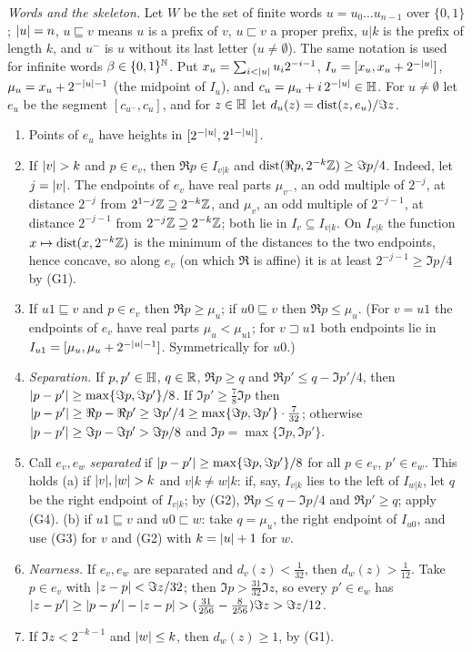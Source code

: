 \emph{Words and the skeleton.} Let $W$ be the set of finite words $u=u_0\dots u_{n-1}$ over $\{0,1\}$; $\lvert u\rvert=n$, $u\sqsubseteq v$
means $u$ is a prefix of $v$, $u\sqsubset v$ a proper prefix, $u|k$ is the prefix of length $k$, and $u^-$ is $u$ without its last
letter ($u\ne\emptyset$). The same notation is used for infinite words $\beta\in\{0,1\}^{\mathbb{N}}$. Put $x_u=\sum_{i<\lvert u\rvert}u_i2^{-i-1}$,
$I_u=[x_u,x_u+2^{-\lvert u\rvert}]$, $\mu_u=x_u+2^{-\lvert u\rvert-1}$ (the midpoint of $I_u$), and $c_u=\mu_u+i\,2^{-\lvert u\rvert}\in\mathbb{H}$. For
$u\ne\emptyset$ let $e_u$ be the segment $[c_{u^-},c_u]$, and for $z\in\mathbb{H}$ let $d_u(z)=\operatorname{dist}(z,e_u)/\Im z$.

\begin{enumerate}
\item[(G1)] Points of $e_u$ have heights in $[2^{-\lvert u\rvert},2^{1-\lvert u\rvert}]$.
\item[(G2)] If $\lvert v\rvert>k$ and $p\in e_v$, then $\Re p\in I_{v|k}$ and $\operatorname{dist}(\Re p,2^{-k}\mathbb{Z})\ge\Im p/4$. Indeed, let $j=\lvert v\rvert$.
The endpoints of $e_v$ have real parts $\mu_{v^-}$, an odd multiple of $2^{-j}$, at distance $2^{-j}$ from $2^{1-j}\mathbb{Z}\supseteq2^{-k}\mathbb{Z}$,
and $\mu_v$, an odd multiple of $2^{-j-1}$, at distance $2^{-j-1}$ from $2^{-j}\mathbb{Z}\supseteq2^{-k}\mathbb{Z}$; both lie in $I_v\subseteq I_{v|k}$.
On $I_{v|k}$ the function $x\mapsto\operatorname{dist}(x,2^{-k}\mathbb{Z})$ is the minimum of the distances to the two endpoints, hence concave, so along
$e_v$ (on which $\Re$ is affine) it is at least $2^{-j-1}\ge\Im p/4$ by (G1).
\item[(G3)] If $u1\sqsubseteq v$ and $p\in e_v$ then $\Re p\ge\mu_u$; if $u0\sqsubseteq v$ then $\Re p\le\mu_u$. (For $v=u1$ the
endpoints of $e_v$ have real parts $\mu_u<\mu_{u1}$; for $v\sqsupset u1$ both endpoints lie in $I_{u1}=[\mu_u,\mu_u+2^{-\lvert u\rvert-1}]$.
Symmetrically for $u0$.)
\item[(G4)] \emph{Separation.} If $p,p'\in\mathbb{H}$, $q\in\mathbb{R}$, $\Re p\ge q$ and $\Re p'\le q-\Im p'/4$, then
$\lvert p-p'\rvert\ge\max\{\Im p,\Im p'\}/8$. If $\Im p'\ge\frac78\Im p$ then $\lvert p-p'\rvert\ge\Re p-\Re p'\ge\Im p'/4\ge\max\{\Im p,\Im p'\}\cdot\frac7{32}$;
otherwise $\lvert p-p'\rvert\ge\Im p-\Im p'>\Im p/8$ and $\Im p=\max\{\Im p,\Im p'\}$.
\item[(G5)] Call $e_v,e_w$ \emph{separated} if $\lvert p-p'\rvert\ge\max\{\Im p,\Im p'\}/8$ for all $p\in e_v$, $p'\in e_w$. This holds
(a) if $\lvert v\rvert,\lvert w\rvert>k$ and $v|k\ne w|k$: if, say, $I_{v|k}$ lies to the left of $I_{w|k}$, let $q$ be the right endpoint of $I_{v|k}$; by
(G2), $\Re p\le q-\Im p/4$ and $\Re p'\ge q$; apply (G4). (b) if $u1\sqsubseteq v$ and $u0\sqsubset w$: take $q=\mu_u$, the right endpoint
of $I_{u0}$, and use (G3) for $v$ and (G2) with $k=\lvert u\rvert+1$ for $w$.
\item[(G6)] \emph{Nearness.} If $e_v,e_w$ are separated and $d_v(z)<\frac1{32}$, then $d_w(z)>\frac1{12}$. Take $p\in e_v$ with
$\lvert z-p\rvert<\Im z/32$; then $\Im p>\frac{31}{32}\Im z$, so every $p'\in e_w$ has $\lvert z-p'\rvert\ge\lvert p-p'\rvert-\lvert z-p\rvert>(\frac{31}{256}-\frac8{256})\Im z>\Im z/12$.
\item[(G7)] If $\Im z<2^{-k-1}$ and $\lvert w\rvert\le k$, then $d_w(z)\ge1$, by (G1).
\end{enumerate}

